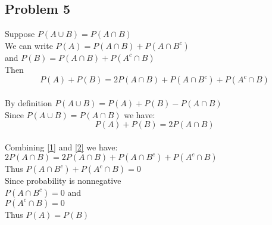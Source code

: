 \documentclass{article}
\begin{document}
\begin{flushleft}
\section{Problem 5}
Suppose $P(A \cup B) = P(A \cap B)$\\
We can write $P(A)=P(A\cap B)+P(A \cap B^c)$\\
and $P(B)=P(A \cap B)+P(A^c \cap B)$\\
Then \[P(A)+P(B)=2P(A\cap B)+P(A \cap B^c)+P(A^c\cap B) \label{1} \tag{1}\]\\
By definition $P(A \cup B) = P(A)+P(B)-P(A \cap B)$\\
Since $P(A \cup B)=P(A \cap B)$ we have:\\
\[P(A)+P(B)=2P(A \cap B) \label{2} \tag{2}\]\\
Combining \eqref{1} and \eqref{2} we have:\\
$2P(A \cap B)=2P(A \cap B)+P(A\cap B^c)+P(A^c \cap B)$\\
Thus $P(A \cap B^c)+P(A^c\cap B)=0$\\
Since probability is nonnegative\\
$P(A\cap B^c)=0$ and\\
$P(A^c \cap B)=0$\\
Thus $P(A)=P(B)$




\end{flushleft}
\end{document}
